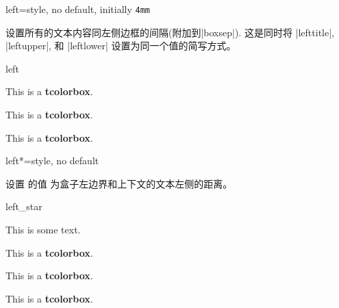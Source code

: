 \begin{docTcbKey}{left}{=}{style, no default, initially \texttt{4mm}}

设置所有的文本内容同左侧边框的间隔(附加到|boxsep|).
这是同时将 |lefttitle|, |leftupper|, 和 |leftlower| 设置为同一个值的简写方式。
\begin{exdispExample}{left}

\begin{tcolorbox}
  This is a \textbf{tcolorbox}.
  \end{tcolorbox}

\begin{tcolorbox}[left=0mm]
This is a \textbf{tcolorbox}.
\end{tcolorbox}

\begin{tcolorbox}[left=10mm]
This is a \textbf{tcolorbox}.
\end{tcolorbox}
\end{exdispExample}
\end{docTcbKey}

\begin{docTcbKey}[][doc new=2017-02-16]{left*}{=}{style, no default}

设置  的值  为盒子左边界和上下文的文本左侧的距离。

\begin{exdispExample}{left_star}

This is some text.
\begin{tcolorbox}[grow to left by=5mm,left*=0mm,
  enhanced,show bounding box]
This is a \textbf{tcolorbox}.
\end{tcolorbox}

\begin{tcolorbox}[left*=0mm,
  enhanced,show bounding box]
This is a \textbf{tcolorbox}.
\end{tcolorbox}

\begin{tcolorbox}
This is a \textbf{tcolorbox}.
\end{tcolorbox}
\end{exdispExample}
\end{docTcbKey}




